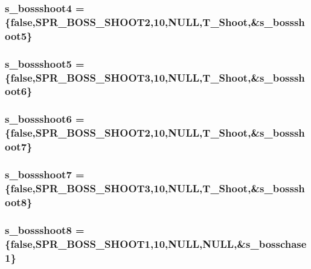 \label{WL__ACT2_8C_a24c6ef26a80f794833d9a763fef69be2}
\hypertarget{WL__ACT2_8C_a78df2716e7b9215264f283b578d5b884}{
\subsubsection[{s\_\-bossshoot4}]{ {\bf s\_\-bossshoot4} = \{false,SPR\_\-BOSS\_\-SHOOT2,10,NULL,T\_\-Shoot,\&{\bf s\_\-bossshoot5}\}}}
\label{WL__ACT2_8C_a78df2716e7b9215264f283b578d5b884}
\hypertarget{WL__ACT2_8C_a4b2ddab891860569bbe1199ac3d82659}{
\subsubsection[{s\_\-bossshoot5}]{ {\bf s\_\-bossshoot5} = \{false,SPR\_\-BOSS\_\-SHOOT3,10,NULL,T\_\-Shoot,\&{\bf s\_\-bossshoot6}\}}}
\label{WL__ACT2_8C_a4b2ddab891860569bbe1199ac3d82659}
\hypertarget{WL__ACT2_8C_abb4697fcd64af4469f1f3487fcb9aca6}{
\subsubsection[{s\_\-bossshoot6}]{ {\bf s\_\-bossshoot6} = \{false,SPR\_\-BOSS\_\-SHOOT2,10,NULL,T\_\-Shoot,\&{\bf s\_\-bossshoot7}\}}}
\label{WL__ACT2_8C_abb4697fcd64af4469f1f3487fcb9aca6}
\hypertarget{WL__ACT2_8C_acd0e8c96f8356c2f331ff30a50aaa9e0}{
\subsubsection[{s\_\-bossshoot7}]{ {\bf s\_\-bossshoot7} = \{false,SPR\_\-BOSS\_\-SHOOT3,10,NULL,T\_\-Shoot,\&{\bf s\_\-bossshoot8}\}}}
\label{WL__ACT2_8C_acd0e8c96f8356c2f331ff30a50aaa9e0}
\hypertarget{WL__ACT2_8C_af95404f552d02a0cdc0e3f8b8905018d}{
\subsubsection[{s\_\-bossshoot8}]{ {\bf s\_\-bossshoot8} = \{false,SPR\_\-BOSS\_\-SHOOT1,10,NULL,NULL,\&{\bf s\_\-bosschase1}\}}}
